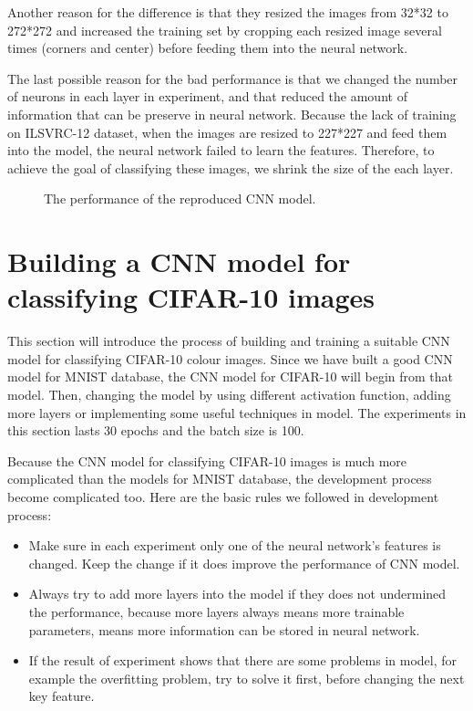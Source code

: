 \documentclass[]{UCD_CS_FYP_Report}
\begin{document}
Another reason for the difference is that they resized the images from 32*32 to 272*272 and increased the training set by cropping each resized image several times (corners  and center) before feeding them into the neural network.

The last possible reason for the bad performance is that we changed the number of neurons in each layer in experiment, and that reduced the amount of information that can be preserve in neural network. Because the lack of training on ILSVRC-12 dataset, when the images are resized to 227*227 and feed them into the model, the neural network failed to learn the features. Therefore, to achieve the goal of classifying these images, we shrink the size of the each layer.
\begin{figure}[h]
\centering
\fboxsep 2mm
\caption{\label{fig:The_performance_of_Benchmark} The performance of the reproduced CNN model.}
\end{figure}
\section{Building a CNN model for classifying CIFAR-10 images}
This section will introduce the process of building and training a suitable CNN model for classifying CIFAR-10 colour images. Since we have built a good CNN model for MNIST database, the CNN model for CIFAR-10 will begin from that model. Then, changing the model by using different activation function, adding more layers or implementing some useful techniques in model. The experiments in this section lasts 30 epochs and the batch size is 100. 

Because the CNN model for classifying CIFAR-10 images is much more complicated than the models for MNIST database, the development process become complicated too. Here are the basic rules we followed in development process:
\begin{itemize}
\item Make sure in each experiment only one of the neural network’s features is changed. Keep the change if it does improve the performance of CNN model. 
\item Always try to add more layers into the model if they does not undermined the performance, because more layers always means more trainable parameters, means more information can be stored in neural network.
\item If the result of experiment shows that there are some problems in model, for example the overfitting problem, try to solve it first, before changing the next key feature.
\end{itemize}
\end{document}
